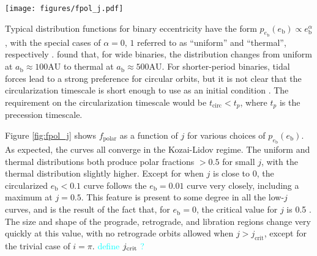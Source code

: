 \documentclass[twocolumn]{aastex631}
\newcommand{\RGM}[1]{\textcolor{cyan}{#1}}
\begin{document}
\begin{figure*}
    \centering
    \texttt{[image: figures/fpol\_j.pdf]}
    \caption{
        Polar disk fraction $f_\text{polar}$ as a function of $j$ for various distributions $p_{e_\text{b}}(e_\text{b})$. All cases assume isotropic distributions of initial angular momentum. In the thermal case, $p_{e_\text{b}}(e_\text{b}) \propto e_\text{b}$. In the uniform case, $p_{e_\text{b}}(e_\text{b}) = \text{const}$. The case labeled $e_\text{b} < 0.1$ uses a uniform distribution, but restricts the domain to $e_\text{b} \in [0,0.1)$. These three distributions are shown in the inset. The dashed line cases fix $e_\text{b}$ at a particular value. Notice the maximum that occurs at $j\approx 0.5$. This occurs because the appearance of crescent orbits along with the disappearance of retrograde orbits at $j=j_\text{cr}$ \citep[eq. A3]{martin2019} make the parameter space that eventually evolves to polar very large.
    }
    \label{fig:fpol_j}
\end{figure*}

Typical distribution functions for binary eccentricity have the form $p_{e_\text{b}}(e_\text{b}) \propto e_\text{b}^\alpha$, with the special cases of $\alpha=0,\,1$ referred to as ``uniform'' and ``thermal'', respectively \citep[see also \citealt{ceppi2024}]{hwang2022}. \citet{hwang2022} found that, for wide binaries, the distribution changes from uniform at $a_\text{b}\approx 100\text{AU}$ to thermal at $a_\text{b}\approx 500\text{AU}$. For shorter-period binaries, tidal forces lead to a strong preference for circular orbits, but it is not clear that the circularization timescale is short enough to use as an initial condition \citep[e.g.,][]{meibom2005,geller2012}. The requirement on the circularization timescale would be $t_\text{circ} < t_p$, where $t_p$ is the precession timescale.

Figure \ref{fig:fpol_j} shows $f_\text{polar}$ as a function of $j$ for various choices of $p_{e_\text{b}}(e_\text{b})$. As expected, the curves all converge in the Kozai-Lidov regime. The uniform and thermal distributions both produce polar fractions $>0.5$ for small $j$, with the thermal distribution slightly higher. Except for when $j$ is close to 0, the circularized $e_\text{b} < 0.1$ curve follows the $e_\text{b} = 0.01$ curve very closely, including a maximum at $j=0.5$. This feature is present to some degree in all the low-$j$ curves, and is the result of the fact that, for $e_\text{b}=0$, the critical value for $j$ is 0.5 \citet{abod2022}. The size and shape of the prograde, retrograde, and libration regions change very quickly at this value, with no retrograde orbits allowed when $j>j_\text{crit}$, except for the trivial case of $i=\pi$. \RGM{define $j_{\rm crit}$ ?}
\end{document}
